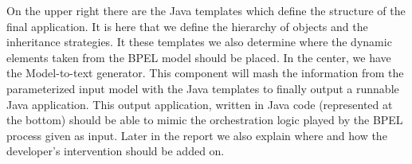 On the upper right there are the Java templates which define the structure of the final application. It is here that we define the hierarchy of objects and the inheritance strategies. It these templates we also determine where the dynamic elements taken from the BPEL model should be placed.  
In the center, we have the Model-to-text generator. This component will mash the information from the parameterized input model with the Java templates to finally output a runnable Java application. This output application, written in Java code (represented at the bottom) should be able to mimic the orchestration logic played by the BPEL process given as input.  
Later in the report we also explain where and how the developer's intervention should be added on.








